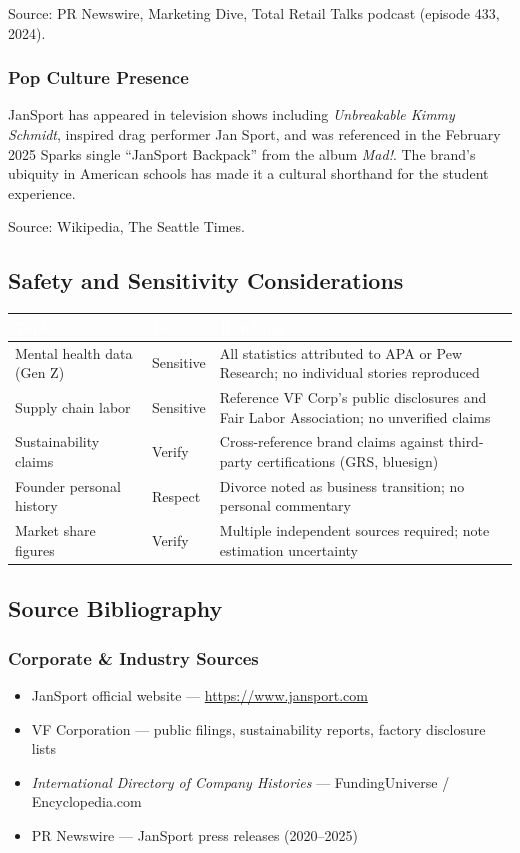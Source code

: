\documentclass[11pt,letterpaper]{article}
\newcommand{\tableheader}[1]{\textbf{\sffamily\textcolor{white}{#1}}}
\begin{document}
Source: PR Newswire, Marketing Dive, Total Retail Talks podcast (episode 433, 2024).

\subsubsection{Pop Culture Presence}

JanSport has appeared in television shows including \textit{Unbreakable Kimmy Schmidt}, inspired drag performer Jan Sport, and was referenced in the February 2025 Sparks single ``JanSport Backpack'' from the album \textit{Mad!}. The brand's ubiquity in American schools has made it a cultural shorthand for the student experience.

Source: Wikipedia, The Seattle Times.

\subsection{Safety and Sensitivity Considerations}

\begin{center}
\begin{tabularx}{\textwidth}{L{3.5cm}L{2cm}X}
\toprule
{}
\tableheader{Topic} & \tableheader{Level} & \tableheader{Handling} \\
\midrule
Mental health data (Gen Z) & Sensitive & All statistics attributed to APA or Pew Research; no individual stories reproduced \\
Supply chain labor & Sensitive & Reference VF Corp's public disclosures and Fair Labor Association; no unverified claims \\
Sustainability claims & Verify & Cross-reference brand claims against third-party certifications (GRS, bluesign) \\
Founder personal history & Respect & Divorce noted as business transition; no personal commentary \\
Market share figures & Verify & Multiple independent sources required; note estimation uncertainty \\
\bottomrule
\end{tabularx}
\end{center}

\subsection{Source Bibliography}

\subsubsection{Corporate \& Industry Sources}
\begin{itemize}[nosep]
  \item JanSport official website --- \url{https://www.jansport.com}
  \item VF Corporation --- public filings, sustainability reports, factory disclosure lists
  \item \textit{International Directory of Company Histories} --- FundingUniverse / Encyclopedia.com
  \item PR Newswire --- JanSport press releases (2020--2025)
\end{itemize}
\end{document}
